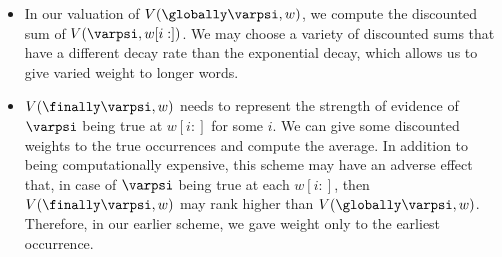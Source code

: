 \begin{itemize}
  
\item In our valuation of $V(\globally \varpsi, w)$, we compute the discounted
  sum of $V(\varpsi, w[i:])$. We may choose a variety of discounted sums that
  have a different decay rate than the exponential decay, which allows us to
  give varied weight to longer words.

\item $V(\finally \varpsi, w)$ needs to represent the strength of evidence of
  $\varpsi$ being true at $w[i:]$ for some $i$. We can give some discounted
  weights to the true occurrences and compute the average. In addition to being
  computationally expensive, this scheme may have an adverse effect that, in
  case of $\varpsi$ being true   at each $w[i:]$,  then $V(\finally \varpsi, w)$
  may rank higher than $V(\globally \varpsi, w)$. Therefore, in our earlier
  scheme, we gave weight only to the earliest occurrence.
\end{itemize}

